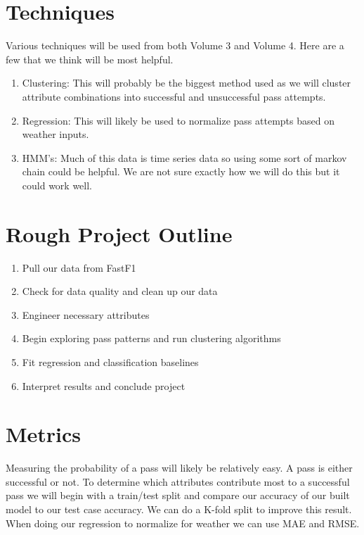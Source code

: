 \documentclass{article}
\begin{document}
\section{Techniques}
Various techniques will be used from both Volume 3 and Volume 4. Here are a few that we think will be most helpful.

\begin{enumerate}[itemsep=0.25em]
    \item Clustering: This will probably be the biggest method used as we will cluster attribute combinations into successful and unsuccessful pass attempts. 
    \item Regression: This will likely be used to normalize pass attempts based on weather inputs. 
    \item HMM's: Much of this data is time series data so using some sort of markov chain could be helpful. We are not sure exactly how we will do this but it could work well.
    
\end{enumerate}

\section{Rough Project Outline}

\begin{enumerate}[itemsep=0.25em]
    \item Pull our data from FastF1 
    \item Check for data quality and clean up our data
    \item Engineer necessary attributes
    \item Begin exploring pass patterns and run clustering algorithms
    \item Fit regression and classification baselines
    \item Interpret results and conclude project
    
\end{enumerate}

\section{Metrics}
Measuring the probability of a pass will likely be relatively easy. A pass is either successful or not. To determine which attributes contribute most to a successful pass we will begin with a train/test split and compare our accuracy of our built model to our test case accuracy. We can do a K-fold split to improve this result. When doing our regression to normalize for weather we can use MAE and RMSE.
\end{document}
